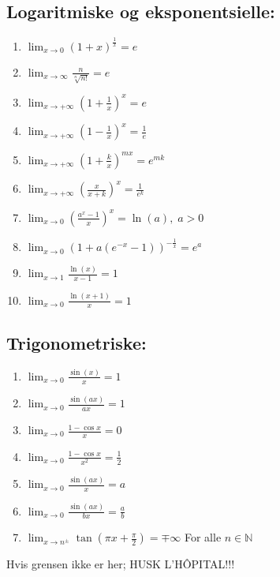 \documentclass[12pt,a4paper,twocolumn,twoside]{article}
\begin{document}
        \subsection*{Logaritmiske og eksponentsielle:}
        \begin{enumerate}
            \item $\lim_{x\to0}(1+x)^{\frac{1}{x}}=e$
            \item $\lim_{x\to\infty}\frac{n}{\sqrt[n]{n!}}=e$
            \item $\lim_{x\to+\infty}\left(1+\frac{1}{x}\right)^x=e$
            \item $\lim_{x\to+\infty}\left(1-\frac{1}{x}\right)^x=\frac{1}{e}$
            \item $\lim_{x\to+\infty}\left(1+\frac{k}{x}\right)^{mx}=e^{mk}$
            \item $\lim_{x\to+\infty}\left(\frac{x}{x+k}\right)^x=\frac{1}{e^k}$
            \item $\lim_{x\to0}\left(\frac{a^x-1}{x}\right)^x=\ln(a),\; a>0$
            \item $\lim_{x\to0}(1+a(e^{-x}-1))^{-\frac{1}{x}}=e^a$
            \item $\lim_{x\to1}\frac{\ln(x)}{x-1}=1$
            \item $\lim_{x\to0}\frac{\ln(x+1)}{x}=1$
        \end{enumerate}
        \subsection*{Trigonometriske:}
        \begin{enumerate}
            \item $\lim_{x\to0}\frac{\sin(x)}{x}=1$
            \item $\lim_{x\to0}\frac{\sin(ax)}{ax}=1$
            \item $\lim_{x\to0}\frac{1-\cos{x}}{x}=0$
            \item $\lim_{x\to0}\frac{1-\cos{x}}{x^2}=\frac{1}{2}$
            \item $\lim_{x\to0}\frac{\sin(ax)}{x}=a$
            \item $\lim_{x\to0}\frac{\sin(ax)}{bx}=\frac{a}{b}$
            \item $\lim_{x\to n^\pm}\tan\left(\pi x+\frac{\pi}{2}\right) = \mp\infty$ For alle $n\in\mathbb{N}$
        \end{enumerate}
        Hvis grensen ikke er her; HUSK L'HÔPITAL!!!
\end{document}
